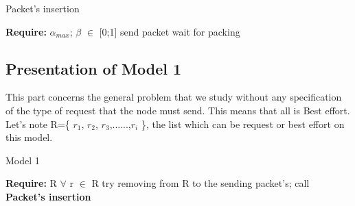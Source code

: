 \documentclass{article}
\begin{document}
\begin{algorithm}
\caption{Packet's insertion}
\begin{algorithmic}
\State \textbf{Require:}  $\alpha_{max}$; $\beta$ $\in$ [0;1]
\State send packet
\Else
\State wait for packing 
\EndIf
\end{algorithmic}
\end{algorithm}  

\subsection{Presentation of Model 1}

This part concerns the general problem that we study without any specification of the type of request that the node must send. This means that all is Best effort.\\
Let's note R=\{ $r_{1}$, $r_{2}$, $r_{3}$,......,$r_{i}$  \}, the list which can be request or best effort on this model.\\
\begin{algorithm}
\caption{Model 1}
\begin{algorithmic}
\State \textbf{Require:} R
\State $\forall$ r $\in$ R try removing from R to the sending packet's;
\State call \textbf{ Packet's insertion}
\end{algorithmic}
\end{algorithm}
\end{document}

